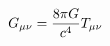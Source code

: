 \documentclass[preview]{standalone}
\begin{document}
\begin{align*}
\special{dvisvgm:raw <g id='unique000'>}G_{\mu\nu} = \frac{8\pi G}{c^4} T_{\mu\nu}\special{dvisvgm:raw </g>}
\end{align*}
\end{document}
